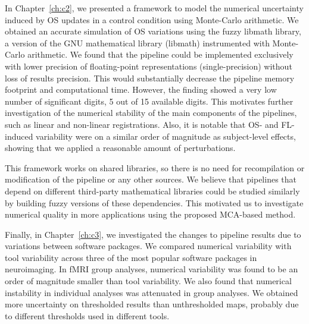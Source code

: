 In Chapter~\ref{ch:c2}, we presented a framework to model the numerical uncertainty induced by OS updates in a control condition using Monte-Carlo arithmetic. 
We obtained an accurate simulation of OS variations using the fuzzy libmath library,
a version of the GNU mathematical library (libmath) instrumented with Monte-Carlo arithmetic.
We found that the pipeline could be implemented exclusively with lower precision of floating-point representations (single-precision)
without loss of results precision. This would substantially decrease the pipeline memory footprint and computational time.
However, the finding showed a very low number of significant digits, 5 out of 15 available digits.
This motivates further investigation of the numerical stability of the main components of the pipelines, such as linear and non-linear registrations.
Also, it is notable that OS- and FL-induced variability were on a similar order of magnitude as subject-level effects,
showing that we applied a reasonable amount of perturbations.

This framework works on shared libraries, so there is no need for recompilation or modification
of the pipeline or any other sources.
We believe that pipelines that depend
on different third-party mathematical libraries could be studied similarly by building fuzzy
versions of these dependencies. This motivated us to investigate numerical quality in
more applications using the proposed MCA-based method.

Finally, in Chapter~\ref{ch:c3}, we investigated the changes to pipeline results due to variations between software packages.
We compared numerical variability with tool variability across three of the most popular software packages in neuroimaging.
In fMRI group analyses, numerical variability was found to be an order of magnitude smaller than tool variability.
We also found that numerical instability in individual analyses was attenuated in group analyses.
We obtained more uncertainty on thresholded results than unthresholded maps, probably due to
different thresholds used in different tools.


